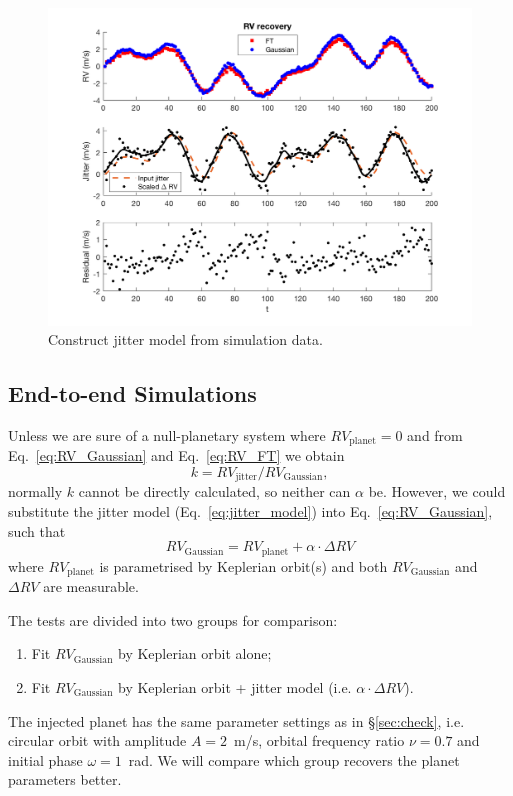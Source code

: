 \begin{figure}[tbp]
\centering
\includegraphics[width = 0.99 \linewidth]
{./Figures/Methods/5-PLANET_AND_JITTER.png}
\caption[Jitter model]
{Construct jitter model from simulation data.}
\label{fig:PLANET_AND_JITTER}
\end{figure} 


\subsection{End-to-end Simulations}

Unless we are sure of a null-planetary system where $RV_\text{planet} = 0$ and
from Eq.~\ref{eq:RV_Gaussian} and Eq.~\ref{eq:RV_FT} we obtain
\begin{equation}
	k = RV_\text{jitter} / RV_\text{Gaussian},
\end{equation} 
normally $k$ cannot be directly calculated, so neither can $\alpha$ be.
However, we could substitute the jitter model (Eq.~\ref{eq:jitter_model}) into Eq.~\ref{eq:RV_Gaussian}, such that
\begin{equation}
	RV_\text{Gaussian} = RV_\text{planet} + \alpha \cdot \Delta RV
\label{eq:RV_fit}
\end{equation}
where $RV_\text{planet}$ is parametrised by Keplerian orbit(s) and both $RV_\text{Gaussian}$ and $\Delta RV$ 
are measurable. 

The tests are divided into two groups for comparison:
\begin{enumerate}
	\item Fit $RV_\text{Gaussian}$ by Keplerian orbit alone;
	\item Fit $RV_\text{Gaussian}$ by Keplerian orbit + jitter model (i.e. $\alpha \cdot \Delta RV$).
\end{enumerate}
The injected planet has the same parameter settings as in \S\ref{sec:check}, i.e. circular orbit with amplitude $A = 2$~m/s,
orbital frequency ratio $\nu = 0.7$ and initial phase $\omega = 1$~rad. We will compare which group recovers the 
planet parameters better. 


